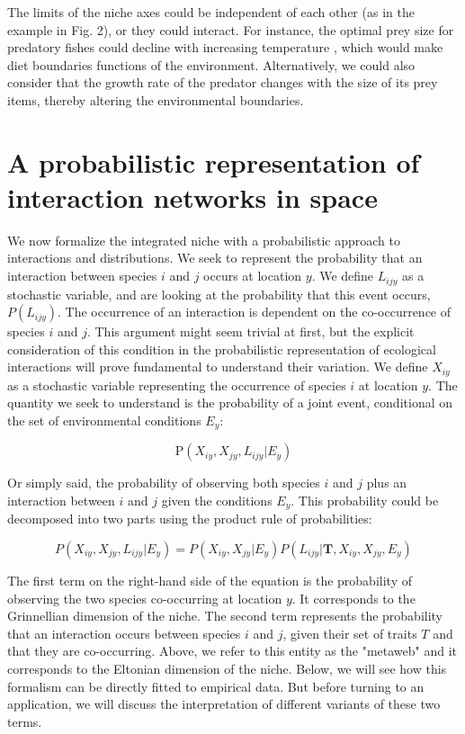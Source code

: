 \documentclass[12pt]{article}
\begin{document}
The limits of the niche axes could be independent of each other (as in the
example in Fig. 2), or  they could interact. For instance, the optimal
prey size for predatory fishes could decline with increasing temperature
\citep{Lelong2015}, which would make diet boundaries functions of the
environment. Alternatively, we could also consider that the growth rate
of the predator changes with the size of its prey items, thereby altering the
environmental boundaries.

\section*{A probabilistic representation of interaction networks in space}

We now formalize the integrated niche with a probabilistic approach to
interactions and distributions. We seek to represent the probability that an
interaction between species $i$ and $j$ occurs at location $y$. We define
$L_{ijy}$ as a stochastic variable, and are looking at the probability that
this event occurs, $P(L_{ijy})$. The occurrence of an interaction is dependent
on the co-occurrence of species $i$ and $j$. This argument might seem trivial
at first, but the explicit consideration of this condition in the
probabilistic representation of ecological interactions will prove fundamental
to understand their variation. We define $X_{iy}$ as a stochastic variable
representing the occurrence of species $i$ at location $y$. The quantity we seek to
understand is the probability of a joint event, conditional on the set of
environmental conditions $E_y$:

\begin{equation}
	\text{P}(X_{iy},X_{jy},L_{ijy}|E_y)
\end{equation}

Or simply said, the probability of observing both species $i$ and $j$ plus an
interaction between $i$ and $j$ given the conditions $E_y$. This probability
could be decomposed into two parts using the product rule of probabilities:

\begin{equation}
	P(X_{iy},X_{jy},L_{ijy}|E_y)=P(X_{iy},X_{jy}|E_y)P(L_{ijy}|\mathbf{T},X_{iy},X_{jy},E_y)
\end{equation}

The first term on the right-hand side of the equation is the probability of
observing the two species co-occurring at location $y$. It corresponds to the
Grinnellian dimension of the niche. The second term represents the probability
that an interaction occurs between species $i$ and $j$, given their set of
traits $T$ and that they are co-occurring. Above, we refer to this entity
as the "metaweb" and it corresponds to the Eltonian dimension of the niche. Below,
we will see how this formalism can be directly fitted to empirical data. But
before turning to an application, we will discuss the interpretation of
different variants of these two terms.
\end{document}
